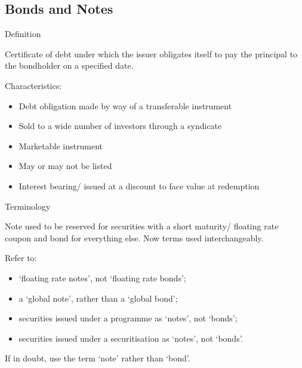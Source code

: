\documentclass[
]{article}
\providecommand{\tightlist}{%
  \setlength{\itemsep}{0pt}\setlength{\parskip}{0pt}}
\newenvironment{env-9f1ad080-32f6-4f2b-8995-b682d7bd2848}
{
    \savenotes\tcolorbox[blanker,breakable,left=5pt,borderline west={2pt}{-4pt}{blue}]
}
{
    \endtcolorbox\spewnotes
}
\newenvironment{env-2d124ec8-9684-4795-b83a-650d2937997a}
{
    \savenotes\tcolorbox[blanker,breakable,left=5pt,borderline west={2pt}{-4pt}{gold}]
}
{
    \endtcolorbox\spewnotes
}
\begin{document}
\hypertarget{bonds-and-notes}{%
\subsection{Bonds and Notes}\label{bonds-and-notes}}

\begin{env-2d124ec8-9684-4795-b83a-650d2937997a}

Definition

Certificate of debt under which the issuer obligates itself to pay the
principal to the bondholder on a specified date.

\end{env-2d124ec8-9684-4795-b83a-650d2937997a}

Characteristics:

\begin{itemize}
\tightlist
\item
  Debt obligation made by way of a transferable instrument
\item
  Sold to a wide number of investors through a syndicate
\item
  Marketable instrument
\item
  May or may not be listed
\item
  Interest bearing/ issued at a discount to face value at redemption
\end{itemize}

\begin{env-9f1ad080-32f6-4f2b-8995-b682d7bd2848}

Terminology

Note used to be reserved for securities with a short maturity/ floating
rate coupon and bond for everything else. Now terms used
interchangeably.

Refer to:

\begin{itemize}
\tightlist
\item
  `floating rate notes', not `floating rate bonds';
\item
  a `global note', rather than a `global bond';
\item
  securities issued under a programme as `notes', not `bonds';
\item
  securities issued under a securitisation as `notes', not `bonds'.
\end{itemize}

If in doubt, use the term `note' rather than `bond'.

\end{env-9f1ad080-32f6-4f2b-8995-b682d7bd2848}
\end{document}
